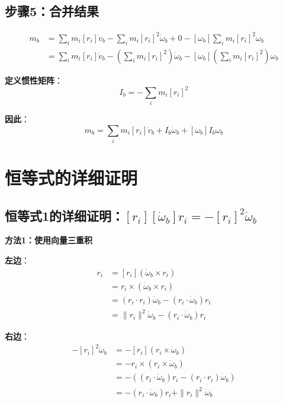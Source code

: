 \documentclass[12pt,a4paper]{article}
\begin{document}
\subsection{步骤5：合并结果}

\begin{align}
m_b &= \sum_i m_i [r_i] \dot{v}_b - \sum_i m_i [r_i]^2 \dot{\omega}_b + 0 - [\omega_b] \sum_i m_i [r_i]^2 \omega_b \\
&= \sum_i m_i [r_i] \dot{v}_b - \left(\sum_i m_i [r_i]^2\right) \dot{\omega}_b - [\omega_b] \left(\sum_i m_i [r_i]^2\right) \omega_b
\end{align}

\textbf{定义惯性矩阵}：
\begin{equation}
I_b = -\sum_i m_i [r_i]^2
\end{equation}

\textbf{因此}：
\begin{equation}
m_b = \sum_i m_i [r_i] \dot{v}_b + I_b \dot{\omega}_b + [\omega_b] I_b \omega_b
\end{equation}

\section{恒等式的详细证明}

\subsection{恒等式1的详细证明：$[r_i][\dot{\omega}_b] r_i = -[r_i]^2 \dot{\omega}_b$}

\textbf{方法1：使用向量三重积}

\textbf{左边}：
\begin{align}
[r_i][\dot{\omega}_b] r_i &= [r_i](\dot{\omega}_b \times r_i) \\
&= r_i \times (\dot{\omega}_b \times r_i) \\
&= (r_i \cdot r_i) \dot{\omega}_b - (r_i \cdot \dot{\omega}_b) r_i \\
&= \|r_i\|^2 \dot{\omega}_b - (r_i \cdot \dot{\omega}_b) r_i
\end{align}

\textbf{右边}：
\begin{align}
-[r_i]^2 \dot{\omega}_b &= -[r_i](r_i \times \dot{\omega}_b) \\
&= -r_i \times (r_i \times \dot{\omega}_b) \\
&= -((r_i \cdot \dot{\omega}_b) r_i - (r_i \cdot r_i) \dot{\omega}_b) \\
&= -(r_i \cdot \dot{\omega}_b) r_i + \|r_i\|^2 \dot{\omega}_b
\end{align}
\end{document}
